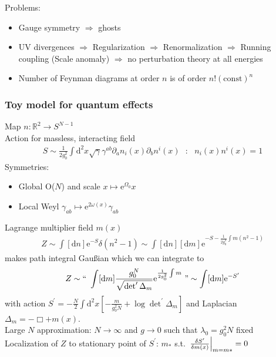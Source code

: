 \documentclass[12pt]{article}
\begin{document}
Problems:
\begin{itemize}
\item Gauge symmetry $\Rightarrow$ ghosts
\item UV divergences $\Rightarrow$ Regularization $\Rightarrow$ Renormalization $\Rightarrow$ Running coupling (Scale anomaly) $\Rightarrow$ no perturbation theory at all energies
\item Number of Feynman diagrams at order $n$ is of order $n!(\mathrm{const})^n$ 
\end{itemize}

\subsubsection{Toy model for quantum effects}
Map $n:\mathbb R^2 \to S^{N-1}$\\
Action for massless, interacting field 
\begin{eqnarray}
S\sim \frac 1{2g_0^2} \int \mathrm d^2 x\sqrt{\gamma}\gamma^{ab} \partial_a n_i(x)\partial_b n^i(x)
~~~:~~~
n_i(x) n^i(x)=1
\end{eqnarray}
Symmetries:
\begin{itemize}
\item Global O($N$) and scale $x\mapsto \mathrm e^{\Omega_0} x$
\item Local Weyl $\gamma_{ab}\mapsto \mathrm e^{2\omega(x)} \gamma_{ab}$
\end{itemize}
Lagrange multiplier field $m(x)$
\begin{eqnarray}
Z\sim \int [\mathrm d n] \mathrm e^{-S} \delta( n^2-1) \sim \int [\mathrm d n]  [\mathrm d m] \mathrm e^{-S-\frac 1{2g_0^2}\int m( n^2-1)}
\end{eqnarray}
makes path integral Gau\ss ian which we can integrate to
\begin{eqnarray}
Z\sim 
	\textrm{``}~\int [\mathrm d m] {g_0^N \over \sqrt {\det^\prime \Delta_m}} \mathrm e^{\frac 1{2g_0^2}\int m} ~ \textrm{''}
\sim \int [\mathrm d m] \mathrm e^{-S^\prime}
\end{eqnarray}
with action $S^\prime = -\frac N2 \int \mathrm d^2 x \left[ -\frac m {g_0^2N}+\log \det^\prime \Delta_m\right]$ and Laplacian $\Delta_m= -\Box +m(x)$.\\
Large $N$ approximation: $N\to \infty$ and $g\to 0$ such that $\lambda_0 = g_0^2 N$ fixed\\
Localization of $Z$ to stationary point of $S^\prime$: $m_*$ s.t. $\left.{\delta S^\prime \over \delta m(x)}\right|_{m=m*}=0$\\
\end{document}
